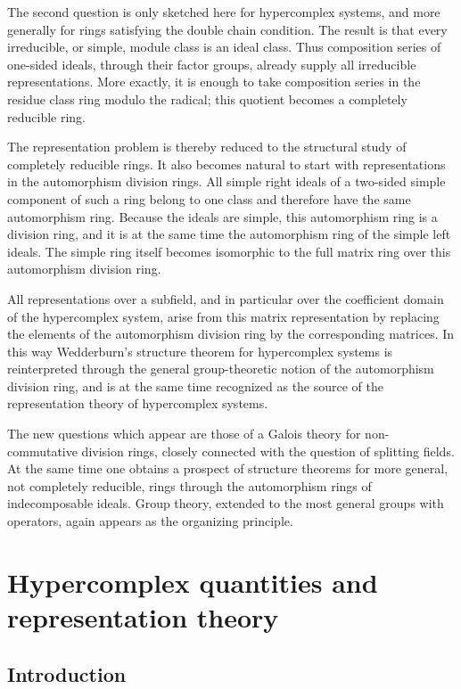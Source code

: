 \documentclass[11pt]{article}
\begin{document}
The second question is only sketched here for hypercomplex systems, and
more generally for rings satisfying the double chain condition. The
result is that every irreducible, or simple, module class is an ideal
class. Thus composition series of one-sided ideals, through their factor
groups, already supply all irreducible representations. More exactly, it
is enough to take composition series in the residue class ring modulo
the radical; this quotient becomes a completely reducible ring.

The representation problem is thereby reduced to the structural study of
completely reducible rings. It also becomes natural to start with
representations in the automorphism division rings. All simple right
ideals of a two-sided simple component of such a ring belong to one
class and therefore have the same automorphism ring. Because the ideals
are simple, this automorphism ring is a division ring, and it is at the
same time the automorphism ring of the simple left ideals. The simple
ring itself becomes isomorphic to the full matrix ring over this
automorphism division ring.

All representations over a subfield, and in particular over the
coefficient domain of the hypercomplex system, arise from this matrix
representation by replacing the elements of the automorphism division
ring by the corresponding matrices. In this way Wedderburn's structure
theorem for hypercomplex systems is reinterpreted through the general
group-theoretic notion of the automorphism division ring, and is at the
same time recognized as the source of the representation theory of
hypercomplex systems.

The new questions which appear are those of a Galois theory for
non-commutative division rings, closely connected with the question of
splitting fields. At the same time one obtains a prospect of structure
theorems for more general, not completely reducible, rings through the
automorphism rings of indecomposable ideals. Group theory, extended to
the most general groups with operators, again appears as the organizing
principle.

\section{Hypercomplex quantities and representation
theory}\label{hypercomplex-quantities-and-representation-theory}

\subsection{Introduction}\label{introduction-1}
\end{document}
